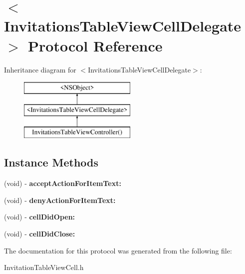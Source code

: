 \hypertarget{protocol_invitations_table_view_cell_delegate-p}{\section{$<$Invitations\+Table\+View\+Cell\+Delegate$>$ Protocol Reference}
\label{protocol_invitations_table_view_cell_delegate-p}
}
Inheritance diagram for $<$Invitations\+Table\+View\+Cell\+Delegate$>$\+:\begin{figure}[H]
\begin{center}
\leavevmode
\includegraphics[height=3.000000cm]{protocol_invitations_table_view_cell_delegate-p}
\end{center}
\end{figure}
\subsection*{Instance Methods}
\begin{DoxyCompactItemize}
\item 
\hypertarget{protocol_invitations_table_view_cell_delegate-p_a05040e4abad19583bdb7bc483e8c6f28}{(void) -\/ {\bfseries accept\+Action\+For\+Item\+Text\+:}}\label{protocol_invitations_table_view_cell_delegate-p_a05040e4abad19583bdb7bc483e8c6f28}

\item 
\hypertarget{protocol_invitations_table_view_cell_delegate-p_a1cd4c74ba72b637f27923c62bd6e8680}{(void) -\/ {\bfseries deny\+Action\+For\+Item\+Text\+:}}\label{protocol_invitations_table_view_cell_delegate-p_a1cd4c74ba72b637f27923c62bd6e8680}

\item 
\hypertarget{protocol_invitations_table_view_cell_delegate-p_aa985fcee68043e8a8f4fc4f87eed3e80}{(void) -\/ {\bfseries cell\+Did\+Open\+:}}\label{protocol_invitations_table_view_cell_delegate-p_aa985fcee68043e8a8f4fc4f87eed3e80}

\item 
\hypertarget{protocol_invitations_table_view_cell_delegate-p_aae7a9a7ce742ceae999e20cb369f0fad}{(void) -\/ {\bfseries cell\+Did\+Close\+:}}\label{protocol_invitations_table_view_cell_delegate-p_aae7a9a7ce742ceae999e20cb369f0fad}

\end{DoxyCompactItemize}


The documentation for this protocol was generated from the following file\+:\begin{DoxyCompactItemize}
\item 
Invitation\+Table\+View\+Cell.\+h\end{DoxyCompactItemize}
